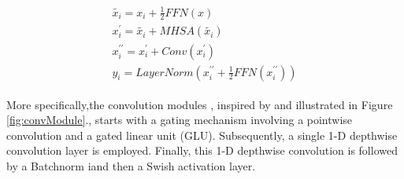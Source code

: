\begin{align}
    \begin{split}
    \tilde{x_i} = x_i + \frac{1}{2}FFN(x) \\
    x_i^{\prime} =\tilde{x_i} + MHSA(\tilde{x_i}) \\
    x_i^{\prime\prime} = x_i^{\prime} + Conv(x_i^{\prime}) \\
    y_i = LayerNorm(x_i^{\prime\prime} + \frac{1}{2}FFN(x_i^{\prime\prime}))
    \end{split}
\end{align}

More specifically,the convolution modules , inspired by \cite{wu2020lite} and illustrated in Figure \ref{fig:convModule}., starts with a gating mechanism \cite{dauphin2017language} involving a pointwise convolution and a gated linear unit (GLU). Subsequently, a single 1-D depthwise convolution layer is employed. Finally, this 1-D depthwise convolution is followed by a Batchnorm iand then a Swish activation layer.


